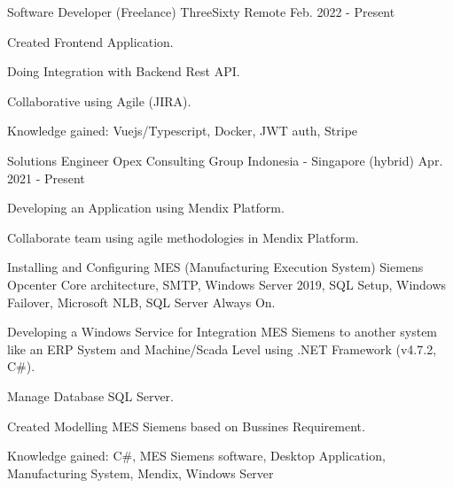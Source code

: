 

\begin{cventries}

  \cventry
  {Software Developer (Freelance)} %
  {ThreeSixty} %
  {Remote} %
  {Feb. 2022 - Present} %
  {
    \begin{cvitems} %
      \item {Created Frontend Application.}
      \item {Doing Integration with Backend Rest API.}
      \item {Collaborative using Agile (JIRA).}
      \item {Knowledge gained: Vuejs/Typescript, Docker, JWT auth, Stripe}
    \end{cvitems}
  }
  
  \cventry
    {Solutions Engineer} %
    {Opex Consulting Group} %
    {Indonesia - Singapore (hybrid)} %
    {Apr. 2021 - Present} %
    {
      \begin{cvitems} %
        \item {Developing an Application using Mendix Platform.}
        \item {Collaborate team using agile methodologies in Mendix Platform.}
        \item {Installing and Configuring MES (Manufacturing Execution System) Siemens Opcenter Core architecture, SMTP, Windows Server 2019, SQL Setup, Windows Failover, Microsoft NLB, SQL Server Always On.}
        \item {Developing a Windows Service for Integration MES Siemens to another system like an ERP System and Machine/Scada Level using .NET Framework (v4.7.2, C\#).}
        \item {Manage Database SQL Server.}
        \item {Created Modelling MES Siemens based on Bussines Requirement.}
        \item {Knowledge gained: C\#, MES Siemens software, Desktop Application, Manufacturing System, Mendix, Windows Server}
      \end{cvitems}
    }


\end{cventries}
